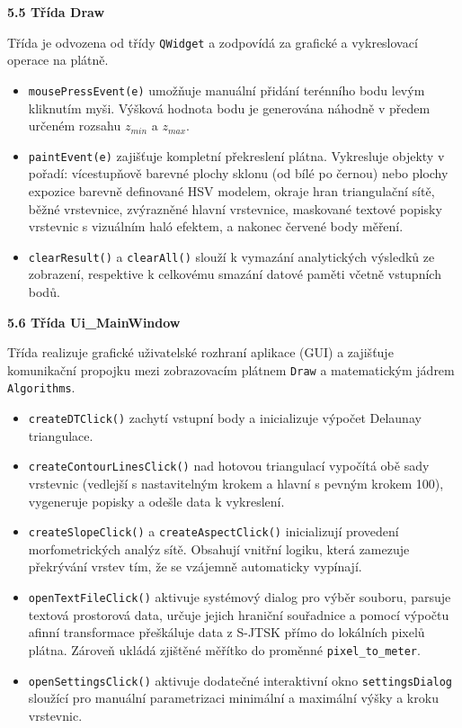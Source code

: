 \documentclass[12pt]{article}
\begin{document}
\textbf{5.5 Třída Draw}

Třída je odvozena od třídy \texttt{QWidget} a zodpovídá za grafické a vykreslovací operace na plátně.

\begin{itemize}
    \item \texttt{mousePressEvent(e)} umožňuje manuální přidání terénního bodu levým kliknutím myši. Výšková hodnota bodu je generována náhodně v předem určeném rozsahu $z_{min}$ a $z_{max}$.
    \item \texttt{paintEvent(e)} zajišťuje kompletní překreslení plátna. Vykresluje objekty v pořadí: vícestupňově barevné plochy sklonu (od bílé po černou) nebo plochy expozice barevně definované HSV modelem, okraje hran triangulační sítě, běžné vrstevnice, zvýrazněné hlavní vrstevnice, maskované textové popisky vrstevnic s vizuálním haló efektem, a nakonec červené body měření.
    \item \texttt{clearResult()} a \texttt{clearAll()} slouží k vymazání analytických výsledků ze zobrazení, respektive k celkovému smazání datové paměti včetně vstupních bodů.
\end{itemize}

\textbf{5.6 Třída Ui\_MainWindow}

Třída realizuje grafické uživatelské rozhraní aplikace (GUI) a zajišťuje komunikační propojku mezi zobrazovacím plátnem \texttt{Draw} a matematickým jádrem \texttt{Algorithms}.

\begin{itemize}
    \item \texttt{createDTClick()} zachytí vstupní body a inicializuje výpočet Delaunay triangulace.
    \item \texttt{createContourLinesClick()} nad hotovou triangulací vypočítá obě sady vrstevnic (vedlejší s nastavitelným krokem a hlavní s pevným krokem 100), vygeneruje popisky a odešle data k vykreslení.
    \item \texttt{createSlopeClick()} a \texttt{createAspectClick()} inicializují provedení morfometrických analýz sítě. Obsahují vnitřní logiku, která zamezuje překrývání vrstev tím, že se vzájemně automaticky vypínají.
    \item \texttt{openTextFileClick()} aktivuje systémový dialog pro výběr souboru, parsuje textová prostorová data, určuje jejich hraniční souřadnice a pomocí výpočtu afinní transformace přeškáluje data z S-JTSK přímo do lokálních pixelů plátna. Zároveň ukládá zjištěné měřítko do proměnné \texttt{pixel\_to\_meter}.
    \item \texttt{openSettingsClick()} aktivuje dodatečné interaktivní okno \texttt{settingsDialog} sloužící pro manuální parametrizaci minimální a maximální výšky a kroku vrstevnic.
\end{itemize}
\end{document}
